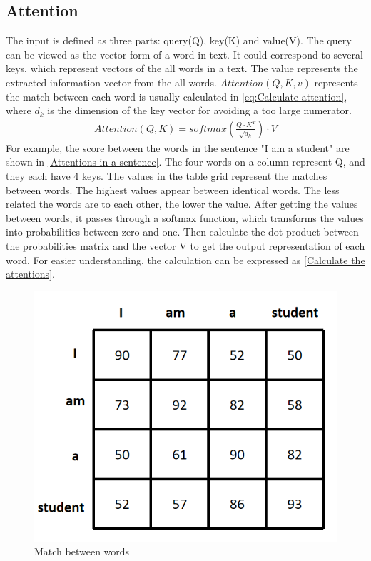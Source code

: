 \subsection{Attention}
  The input is defined as three parts:
  query(Q), key(K) and value(V). The query can be viewed as the vector form of a word in text. It could correspond to several keys, which represent vectors of the all words 
  in a text. The value represents the extracted information vector from the all words. $Attention(Q, K, v)$ represents the match between each word
  is usually calculated in \autoref{eq:Calculate attention}, where $d_k$ is the dimension of the key vector for avoiding a too large numerator. 
  \begin{equation}
    \begin{aligned}
      Attention(Q,K)=softmax(\frac{Q\cdot K^T}{\sqrt{d_{k}}}) \cdot V 
        \label{eq:Calculate attention}
    \end{aligned}
  \end{equation}
  For example, the score between the words in the sentence "I am a student" are shown in \autoref{Attentions in a sentence}. The four words on a column represent Q, and they each have 4 
  keys. The values in the table grid represent the matches between words. The highest values appear between identical words. The less related the words are to each other, the lower the 
  value. After getting the values between words, it passes through a softmax function, which transforms the values into probabilities between zero and one. Then calculate the dot product
  between the probabilities matrix and the vector V to get the output representation of each word. For easier understanding, the calculation can be expressed as \autoref{Calculate the attentions}.
  \begin{figure}
    \centering
    \includegraphics[width=0.6\linewidth]{example_images/IamAStudent}
    \caption{Match between words}
    \label{Attentions in a sentence}
  \end{figure}
